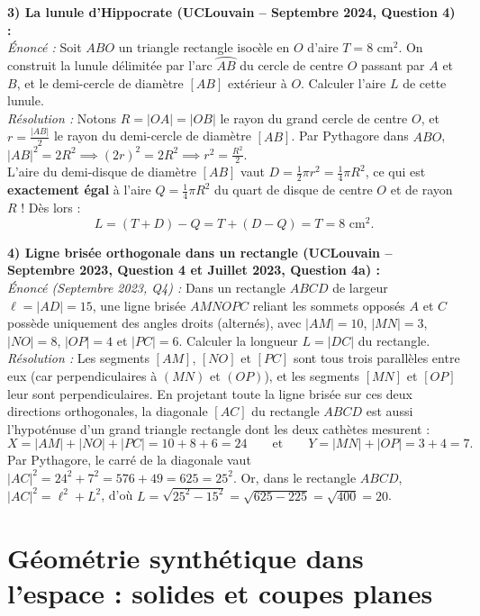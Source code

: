 \begin{exemple}
\medskip
\textbf{3) La lunule d'Hippocrate (UCLouvain -- Septembre 2024, Question 4) :}\\
\emph{Énoncé :} Soit $ABO$ un triangle rectangle isocèle en $O$ d'aire $T = 8\text{ cm}^2$. On construit la lunule délimitée par l'arc $\wideparen{AB}$ du cercle de centre $O$ passant par $A$ et $B$, et le demi-cercle de diamètre $[AB]$ extérieur à $O$. Calculer l'aire $L$ de cette lunule.\\
\emph{Résolution :} Notons $R = |OA| = |OB|$ le rayon du grand cercle de centre $O$, et $r = \frac{|AB|}{2}$ le rayon du demi-cercle de diamètre $[AB]$. Par Pythagore dans $ABO$, $|AB|^2 = 2R^2 \implies (2r)^2 = 2R^2 \implies r^2 = \frac{R^2}{2}$.\\
L'aire du demi-disque de diamètre $[AB]$ vaut $D = \frac{1}{2}\pi r^2 = \frac{1}{4}\pi R^2$, ce qui est \textbf{exactement égal} à l'aire $Q = \frac{1}{4}\pi R^2$ du quart de disque de centre $O$ et de rayon $R$ ! Dès lors :
\[
    L = (T + D) - Q = T + (D - Q) = T = \boxed{8\text{ cm}^2}.
\]

\medskip
\textbf{4) Ligne brisée orthogonale dans un rectangle (UCLouvain -- Septembre 2023, Question 4 et Juillet 2023, Question 4a) :}\\
\emph{Énoncé (Septembre 2023, Q4) :} Dans un rectangle $ABCD$ de largeur $\ell = |AD| = 15$, une ligne brisée $A M N O P C$ reliant les sommets opposés $A$ et $C$ possède uniquement des angles droits (alternés), avec $|AM| = 10$, $|MN| = 3$, $|NO| = 8$, $|OP| = 4$ et $|PC| = 6$. Calculer la longueur $L = |DC|$ du rectangle.\\
\emph{Résolution :} Les segments $[AM]$, $[NO]$ et $[PC]$ sont tous trois parallèles entre eux (car perpendiculaires à $(MN)$ et $(OP)$), et les segments $[MN]$ et $[OP]$ leur sont perpendiculaires. En projetant toute la ligne brisée sur ces deux directions orthogonales, la diagonale $[AC]$ du rectangle $ABCD$ est aussi l'hypoténuse d'un grand triangle rectangle dont les deux cathètes mesurent :
\[
    X = |AM| + |NO| + |PC| = 10 + 8 + 6 = 24 \qquad \text{et} \qquad Y = |MN| + |OP| = 3 + 4 = 7.
\]
Par Pythagore, le carré de la diagonale vaut $|AC|^2 = 24^2 + 7^2 = 576 + 49 = 625 = 25^2$. Or, dans le rectangle $ABCD$, $|AC|^2 = \ell^2 + L^2$, d'où $L = \sqrt{25^2 - 15^2} = \sqrt{625 - 225} = \sqrt{400} = \boxed{20}$.
\end{exemple}

\section{Géométrie synthétique dans l'espace : solides et coupes planes}

